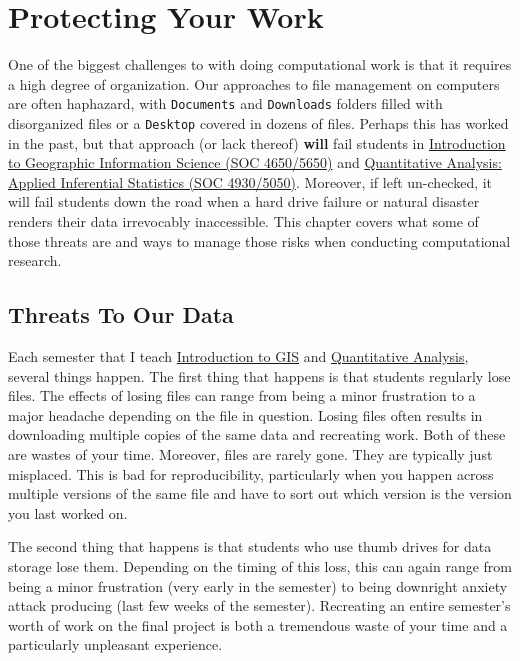 \documentclass[]{book}
\theoremstyle{definition}
\theoremstyle{definition}
\theoremstyle{definition}
\theoremstyle{remark}
\begin{document}
\hypertarget{protecting-your-work}{\chapter{Protecting Your
Work}\label{protecting-your-work}}

One of the biggest challenges to with doing computational work is that
it requires a high degree of organization. Our approaches to file
management on computers are often haphazard, with \texttt{Documents} and
\texttt{Downloads} folders filled with disorganized files or a
\texttt{Desktop} covered in dozens of files. Perhaps this has worked in
the past, but that approach (or lack thereof) \textbf{will} fail
students in \href{https://slu-soc5650.github.io}{Introduction to
Geographic Information Science (SOC 4650/5650)} and
\href{https://slu-soc5050.github.io}{Quantitative Analysis: Applied
Inferential Statistics (SOC 4930/5050)}. Moreover, if left un-checked,
it will fail students down the road when a hard drive failure or natural
disaster renders their data irrevocably inaccessible. This chapter
covers what some of those threats are and ways to manage those risks
when conducting computational research.

\section{Threats To Our Data}\label{threats-to-our-data}

Each semester that I teach
\href{https://slu-soc5650.github.io}{Introduction to GIS} and
\href{https://slu-soc5050.github.io}{Quantitative Analysis}, several
things happen. The first thing that happens is that students regularly
lose files. The effects of losing files can range from being a minor
frustration to a major headache depending on the file in question.
Losing files often results in downloading multiple copies of the same
data and recreating work. Both of these are wastes of your time.
Moreover, files are rarely gone. They are typically just misplaced. This
is bad for reproducibility, particularly when you happen across multiple
versions of the same file and have to sort out which version is the
version you last worked on.

The second thing that happens is that students who use thumb drives for
data storage lose them. Depending on the timing of this loss, this can
again range from being a minor frustration (very early in the semester)
to being downright anxiety attack producing (last few weeks of the
semester). Recreating an entire semester's worth of work on the final
project is both a tremendous waste of your time and a particularly
unpleasant experience.
\end{document}
